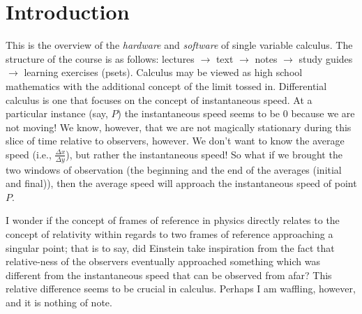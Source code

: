 \documentclass{article}
\begin{document}

\section{Introduction}

This is the overview of the \textit{hardware} and \textit{software} of single variable calculus. The structure of the course is as follows: lectures $\longrightarrow $ text \( \longrightarrow  \) notes \( \longrightarrow  \) study guides \( \longrightarrow  \) learning exercises (psets). Calculus may be viewed as high school mathematics with the additional concept of the limit tossed in. Differential calculus is one that focuses on the concept of instantaneous speed. At a particular instance (say, \( P \)) the instantaneous speed seems to be $0$ because we are not moving! We know, however, that we are not magically stationary during this slice of time relative to observers, however. We don't want to know the average speed (i.e., \( \frac{\Delta x}{\Delta y} \)), but rather the instantaneous speed! So what if we brought the two windows of observation (the beginning and the end of the averages (initial and final)), then the average speed will approach the instantaneous speed of point \( P \). 

I wonder if the concept of frames of reference in physics directly relates to the concept of relativity within regards to two frames of reference approaching a singular point; that is to say, did Einstein take inspiration from the fact that relative-ness of the observers eventually approached something which was different from the instantaneous speed that can be observed from afar? This relative difference seems to be crucial in calculus. Perhaps I am waffling, however, and it is nothing of note. 

\end{document}
